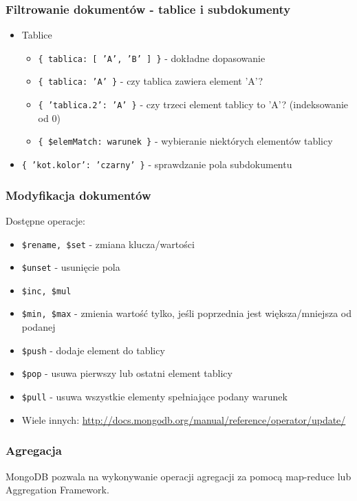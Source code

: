 \documentclass{beamer}
\begin{document}
  \begin{frame}
    \frametitle{Filtrowanie dokumentów - tablice i subdokumenty}
    \begin{itemize}
      \item Tablice
      \begin{itemize}
        \item \texttt{\{ tablica: [ 'A', 'B' ] \}} - dokładne dopasowanie
        \item \texttt{\{ tablica: 'A' \}} - czy tablica zawiera element 'A'?
        \item \texttt{\{ 'tablica.2': 'A' \}} - czy trzeci element tablicy to 'A'? (indeksowanie od 0)
        \item \texttt{\{ \$elemMatch: warunek \}} - wybieranie niektórych elementów tablicy
      \end{itemize}
      \item \texttt{\{ 'kot.kolor': 'czarny' \}} - sprawdzanie pola subdokumentu
      
    \end{itemize}
  \end{frame}

  \begin{frame}
    \frametitle{Modyfikacja dokumentów}
    Dostępne operacje:
    \begin{itemize}
      \item \texttt{\$rename, \$set} - zmiana klucza/wartości
      \item \texttt{\$unset} - usunięcie pola
      \item \texttt{\$inc, \$mul}
      \item \texttt{\$min, \$max} - zmienia wartość tylko, jeśli poprzednia jest większa/mniejsza od podanej
      \item \texttt{\$push} - dodaje element do tablicy
      \item \texttt{\$pop} - usuwa pierwszy lub ostatni element tablicy
      \item \texttt{\$pull} - usuwa wszystkie elementy spełniające podany warunek
      \item Wiele innych: \url{http://docs.mongodb.org/manual/reference/operator/update/}
    \end{itemize}
  \end{frame}

  \begin{frame}
    \frametitle{Agregacja}
    MongoDB pozwala na wykonywanie operacji agregacji za pomocą map-reduce lub Aggregation Framework.
  \end{frame}
\end{document}
